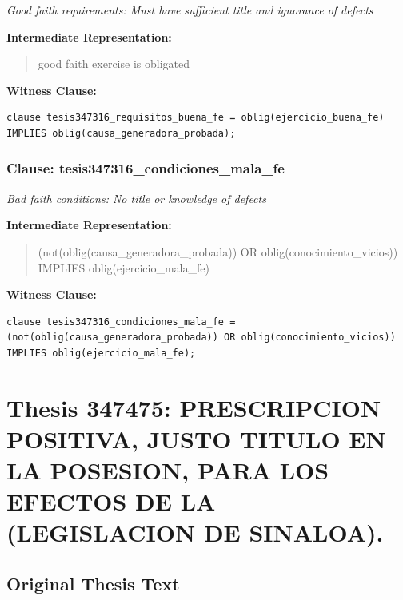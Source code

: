 \documentclass[11pt,a4paper]{article}
\begin{document}
\textit{Good faith requirements: Must have sufficient title and ignorance of defects}

\textbf{Intermediate Representation:}

\begin{quote}
good faith exercise is obligated
\end{quote}

\textbf{Witness Clause:}

\begin{lstlisting}[style=witnessstyle, language=Witness]
clause tesis347316_requisitos_buena_fe = oblig(ejercicio_buena_fe) IMPLIES oblig(causa_generadora_probada);
\end{lstlisting}

\subsubsection{Clause: tesis347316\_condiciones\_mala\_fe}

\textit{Bad faith conditions: No title or knowledge of defects}

\textbf{Intermediate Representation:}

\begin{quote}
(not(oblig(causa\_generadora\_probada)) OR oblig(conocimiento\_vicios)) IMPLIES oblig(ejercicio\_mala\_fe)
\end{quote}

\textbf{Witness Clause:}

\begin{lstlisting}[style=witnessstyle, language=Witness]
clause tesis347316_condiciones_mala_fe = (not(oblig(causa_generadora_probada)) OR oblig(conocimiento_vicios)) IMPLIES oblig(ejercicio_mala_fe);
\end{lstlisting}

\newpage

\section{Thesis 347475: PRESCRIPCION POSITIVA, JUSTO TITULO EN LA POSESION, PARA LOS EFECTOS DE LA (LEGISLACION DE SINALOA).}
\label{thesis:347475}

\subsection{Original Thesis Text}
\end{document}
